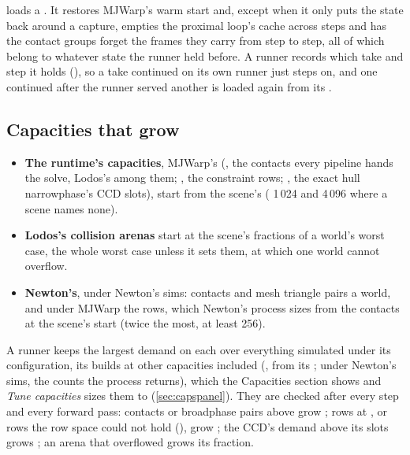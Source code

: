  loads a . It restores MJWarp's warm start and, except when it only puts the state back around a capture, empties the proximal loop's cache across steps and has the contact groups forget the frames they carry from step to step, all of which belong to whatever state the runner held before. A runner records which take and step it holds (), so a take continued on its own runner just steps on, and one continued after the runner served another is loaded again from its .

\subsection{Capacities that grow}\label{sec:capacities}

\begin{itemize}
\item \textbf{The runtime's capacities}, MJWarp's (, the contacts every pipeline hands the solve, Lodos's among them; , the constraint rows; , the exact hull narrowphase's CCD slots), start from the scene's  ( 1\,024 and  4\,096 where a scene names none).
\item \textbf{Lodos's collision arenas} start at the scene's fractions of a world's worst case, the whole worst case unless it sets them, at which one world cannot overflow.
\item \textbf{Newton's}, under Newton's sims: contacts and mesh triangle pairs a world, and under MJWarp the rows, which Newton's process sizes from the contacts at the scene's start (twice the most, at least 256).
\end{itemize}

A runner keeps the largest demand on each over everything simulated under its configuration, its builds at other capacities included (, from its ; under Newton's sims, the counts the process returns), which the Capacities section shows and \emph{Tune capacities} sizes them to (\cref{sec:capspanel}). They are checked after every step and every forward pass: contacts or broadphase pairs above  grow ; rows at , or rows the row space could not hold (), grow ; the CCD's demand above its slots grows ; an arena that overflowed grows its fraction.

